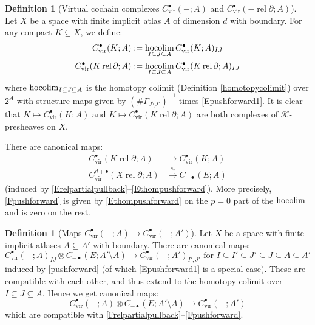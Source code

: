 \documentclass[12pt]{article}
\theoremstyle{definition}
\newtheorem{definition}[theorem]{Definition}
\theoremstyle{remark}
\numberwithin{equation}{subsection}
\newcommand{\K}{\mathcal K}
\newcommand{\hocolim}{\operatornamewithlimits{hocolim}}
\newcommand{\vir}{\mathrm{vir}}
\newcommand{\rel}{\operatorname{rel}}
\begin{document}
\begin{definition}[Virtual cochain complexes $C^\bullet_\vir(-;A)$ and $C^\bullet_\vir(-\rel\partial;A)$]\label{Ccomplexdef}
Let $X$ be a space with finite implicit atlas $A$ of dimension $d$ with boundary.  For any compact $K\subseteq X$, we define:
\begin{align}
\label{CvirdefI}C^\bullet_\vir(K;A)&:=\hocolim_{I\subseteq J\subseteq A}C^\bullet_\vir(K;A)_{IJ}\\
\label{CvirdefII}C^\bullet_\vir(K\rel\partial;A)&:=\hocolim_{I\subseteq J\subseteq A}C^\bullet_\vir(K\rel\partial;A)_{IJ}
\end{align}
where $\hocolim_{I\subseteq J\subseteq A}$ is the homotopy colimit (Definition \ref{homotopycolimit}) over $2^A$ with structure maps given by $(\#\Gamma_{J\setminus J'})^{-1}$ times \eqref{Epushforward1}.  It is clear that $K\mapsto C^\bullet_\vir(K;A)$ and $K\mapsto C^\bullet_\vir(K\rel\partial;A)$ are both complexes of $\K$-presheaves on $X$.

There are canonical maps:
\begin{align}
\label{Frelpartialpullback}C^\bullet_\vir(K\rel\partial;A)&\to C^\bullet_\vir(K;A)\\
\label{Fpushforward}C^{d+\bullet}_\vir(X\rel\partial;A)&\xrightarrow{s_\ast}C_{-\bullet}(E;A)
\end{align}
(induced by \eqref{Erelpartialpullback}--\eqref{Ethompushforward}).  More precisely, \eqref{Fpushforward} is given by \eqref{Ethompushforward} on the $p=0$ part of the $\hocolim$ and is zero on the rest.
\end{definition}

\begin{definition}[Maps $C^\bullet_\vir(-;A)\to C^\bullet_\vir(-;A')$]
Let $X$ be a space with finite implicit atlases $A\subseteq A'$ with boundary.  There are canonical maps:
\begin{equation}
\label{Epushforward1more}C^\bullet_\vir(-;A)_{IJ}\otimes C_{-\bullet}(E;A'\setminus A)\to C^\bullet_\vir(-;A')_{I',J'}\text{ for }I\subseteq I'\subseteq J'\subseteq J\subseteq A\subseteq A'
\end{equation}
induced by \eqref{pushforward} (of which \eqref{Epushforward1} is a special case).  These are compatible with each other, and thus extend to the homotopy colimit over $I\subseteq J\subseteq A$.  Hence we get canonical maps:
\begin{equation}
\label{Fpushforward1}C^\bullet_\vir(-;A)\otimes C_{-\bullet}(E;A'\setminus A)\to C^\bullet_\vir(-;A')
\end{equation}
which are compatible with \eqref{Frelpartialpullback}--\eqref{Fpushforward}.
\end{definition}
\end{document}
